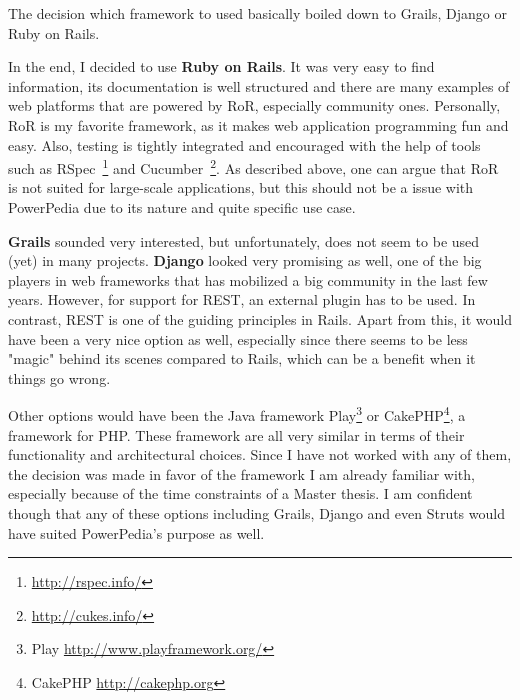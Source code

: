 The decision which framework to used basically boiled down to Grails, Django or Ruby on Rails. 

In the end, I decided to use \textbf{Ruby on Rails}. It was very easy to find information, its documentation is well structured and there are many examples of web platforms that are powered by RoR, especially community ones.
Personally, RoR is my favorite framework, as it makes web application programming fun and easy. Also, testing is tightly integrated and encouraged with the help of tools such as RSpec~\footnote{\url{http://rspec.info/}} and Cucumber~\footnote{\url{http://cukes.info/}}. As described above, one can argue that RoR is not suited for large-scale applications, but this should not be a issue with PowerPedia due to its nature and quite specific use case.  

\textbf{Grails} sounded very interested, but unfortunately, does not seem to be used (yet) in many projects. \textbf{Django} looked very promising as well, one of the big players in web frameworks that has mobilized a big community in the last few years. However, for support for REST, an external plugin has to be used. In contrast, REST is one of the guiding principles in Rails. Apart from this, it would have been a very nice option as well, especially since there seems to be less "magic" behind its scenes compared to Rails, which can be a benefit when it things go wrong.


Other options would have been the Java framework Play\footnote{Play \url{http://www.playframework.org/}} or CakePHP\footnote{CakePHP \url{http://cakephp.org}}, a framework for PHP. These framework are all very similar in terms of their functionality and architectural choices. Since I have not worked with any of them, the decision was made in favor of the framework I am already familiar with, especially because of the time constraints of a Master thesis. I am confident though that any of these options including Grails, Django and even Struts would have suited PowerPedia's purpose as well.

